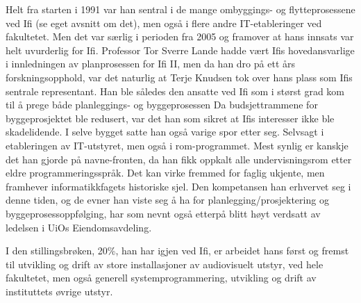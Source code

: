 \documentclass[../../main.tex]{subfiles}
\begin{document}
Helt fra starten i 1991 var han sentral i de mange ombyggings- og flytteprosessene ved Ifi (se eget avsnitt om det), men også i flere andre IT-etableringer ved fakultetet. Men det var særlig i perioden fra 2005 og framover at hans innsats var helt uvurderlig for Ifi. Professor Tor Sverre Lande hadde vært Ifis hovedansvarlige i innledningen av planprosessen for Ifi II, men da han dro på ett års forskningsopphold, var det naturlig at Terje Knudsen tok over hans plass som Ifis sentrale representant. Han ble således den ansatte ved Ifi som i størst grad kom til å prege både planleggings-
og byggeprosessen Da budsjettrammene for byggeprosjektet ble redusert, var det han som sikret at Ifis interesser ikke ble skadelidende. I selve bygget satte han også varige spor etter seg. Selvsagt i etableringen av IT-utstyret, men også i rom-programmet. Mest synlig er kanskje det han gjorde på navne-fronten, da han fikk oppkalt alle undervisningsrom etter eldre programmeringsspråk. Det kan virke fremmed for faglig ukjente, men framhever informatikkfagets historiske sjel. Den kompetansen han erhvervet seg i denne tiden, og de evner han viste seg å ha for planlegging/prosjektering og byggeprosessoppfølging, har som nevnt også etterpå blitt høyt verdsatt av ledelsen i UiOs
Eiendomsavdeling.

I den stillingsbrøken, 20\%, han har igjen ved Ifi, er arbeidet hans først og fremst til utvikling og drift av store installasjoner av audiovisuelt utstyr, ved hele fakultetet, men også generell systemprogrammering, utvikling og drift av instituttets øvrige utstyr.

\end{document}
